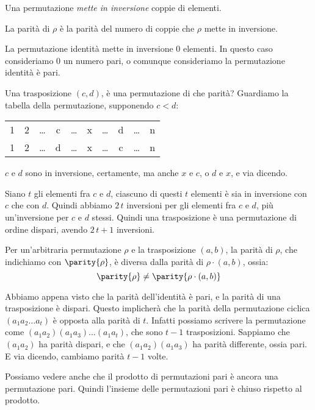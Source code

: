 Una permutazione \emph{mette in inversione} coppie di elementi.

\begin{defn}
	La parit\`a di $\rho$ \`e la parit\`a del numero di coppie che $\rho$ mette in inversione.
\end{defn}

La permutazione identit\`a mette in inversione 0 elementi.
In questo caso consideriamo 0 un numero pari, o comunque consideriamo la permutazione identit\`a \`e pari.

Una trasposizione $(c,d)$, \`e una permutazione di che parit\`a?
Guardiamo la tabella della permutazione, supponendo $c < d$:

\begin{tabular}{*{10}{c}}
	1 & 2 & \dots & c & \dots & x & \dots & d & \dots & n \\
	1 & 2 & \dots & d & \dots & x & \dots & c & \dots & n
\end{tabular}

$c$ e $d$ sono in inversione, certamente, ma anche $x$ e $c$, o $d$ e $x$, e via dicendo.

Siano $t$ gli elementi fra $c$ e $d$, ciascuno di questi $t$ elementi \`e sia in inversione con $c$ che con $d$.
Quindi abbiamo $2 \, t$ inversioni per gli elementi fra $c$ e $d$, pi\`u un'inversione per $c$ e $d$ stessi.
Quindi una trasposizione \`e una permutazione di ordine dispari, avendo $2 \, t + 1$ inversioni.

\begin{prop}
	Per un'arbitraria permutazione $\rho$ e la trasposizione $(a,b)$, la parit\`a di $\rho$, che indichiamo con $\parity{\rho}$, \`e diversa dalla parit\`a di $\rho \cdot (a,b)$, ossia:
	\[
		\parity{\rho} \neq \parity{\rho \cdot (a,b)}
	\]
\end{prop}
Abbiamo appena visto che la parit\`a dell'identit\`a \`e pari, e la parit\`a di una trasposizione \`e dispari.
Questo implicher\`a che la parit\`a della permutazione ciclica $(a_1 a_2 \dots a_t)$ \`e opposta alla parit\`a di $t$.
Infatti possiamo scrivere la permutazione come $(a_1 a_2) (a_1 a_3) \dots (a_1 a_t)$, che sono $t-1$ trasposizioni.
Sappiamo che $(a_1 a_2)$ ha parit\`a dispari, e che $(a_1 a_2) (a_1 a_3)$ ha parit\`a differente, ossia pari.
E via dicendo, cambiamo parit\`a $t-1$ volte.

Possiamo vedere anche che il prodotto di permutazioni pari \`e ancora una permutazione pari.
Quindi l'insieme delle permutazioni pari \`e chiuso rispetto al prodotto.

